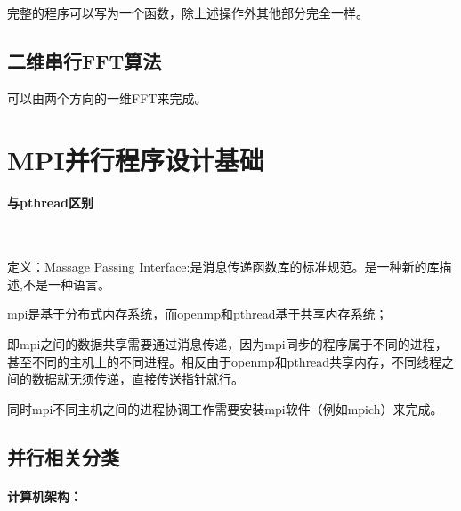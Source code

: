 \documentclass[UTF8]{article}%
\begin{document}
完整的程序可以写为一个函数，除上述操作外其他部分完全一样。 

\subsection{二维串行FFT算法}

可以由两个方向的一维FFT来完成。

\section{MPI并行程序设计基础}

\paragraph{与pthread区别}~{}

定义：Massage Passing Interface:是消息传递函数库的标准规范。是一种新的库描述,不是一种语言。

mpi是基于分布式内存系统，而openmp和pthread基于共享内存系统；

即mpi之间的数据共享需要通过消息传递，因为mpi同步的程序属于不同的进程，甚至不同的主机上的不同进程。相反由于openmp和pthread共享内存，不同线程之间的数据就无须传递，直接传送指针就行。

同时mpi不同主机之间的进程协调工作需要安装mpi软件（例如mpich）来完成。


\subsection{并行相关分类}

\paragraph{计算机架构：}~{}
\end{document}
